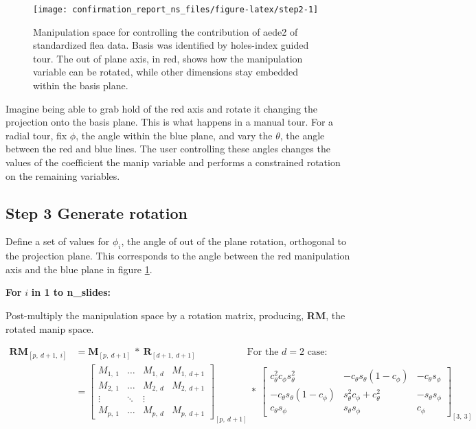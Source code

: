\documentclass{monashthesis}
\begin{document}
\begin{figure}

{\centering \texttt{[image: confirmation\_report\_ns\_files/figure-latex/step2-1]} 

}

\caption{Manipulation space for controlling the contribution of aede2 of standardized flea data. Basis was identified by holes-index guided tour. The out of plane axis, in red, shows how the manipulation variable can be rotated, while other dimensions stay embedded within the basis plane.}\label{fig:step2}
\end{figure}

Imagine being able to grab hold of the red axis and rotate it changing
the projection onto the basis plane. This is what happens in a manual
tour. For a radial tour, fix \(\phi\), the angle within the blue plane,
and vary the \(\theta\), the angle between the red and blue lines. The
user controlling these angles changes the values of the coefficient the
manip variable and performs a constrained rotation on the remaining
variables.

\subsection{Step 3 Generate rotation}\label{step-3-generate-rotation}

Define a set of values for \(\phi_i\), the angle of out of the plane
rotation, orthogonal to the projection plane. This corresponds to the
angle between the red manipulation axis and the blue plane in figure
\ref{fig:step2}.

\textbf{For } \(i\) \textbf{in 1 to n\_slides:}

Post-multiply the manipulation space by a rotation matrix, producing,
\textbf{RM}, the rotated manip space.

\begin{align*}
  \textbf{RM}_{[p,~d+1,~i]}
  &= \textbf{M}_{[p,~d+1]} ~*~ \textbf{R}_{[d+1,~d+1]}
    ~~~~~~~~~~~~~~~~~~~~~~~~\text{For the $d=2$ case:} \\
  &= \begin{bmatrix}
    M_{1,~1} & \dots & M_{1,~d} & M_{1,~d+1} \\
    M_{2,~1} & \dots & M_{2,~d} & M_{2,~d+1} \\
    \vdots   & \ddots& \vdots   \\
    M_{p,~1} & \dots & M_{p,~d} & M_{p,~d+1}
  \end{bmatrix}_{[p,~d+1]}
    ~*~
  \begin{bmatrix}
    c_\theta^2 c_\phi s_\theta^2 &
    -c_\theta s_\theta (1 - c_\phi) &
    -c_\theta s_\phi \\
    -c_\theta s_\theta (1 - c_\phi) &
    s_\theta^2 c_\phi + c_\theta^2 &
    -s_\theta s_\phi \\
    c_\theta s_\phi &
    s_\theta s_\phi &
    c_\phi
  \end{bmatrix}_{[3,~3]}
\end{align*}
\end{document}

